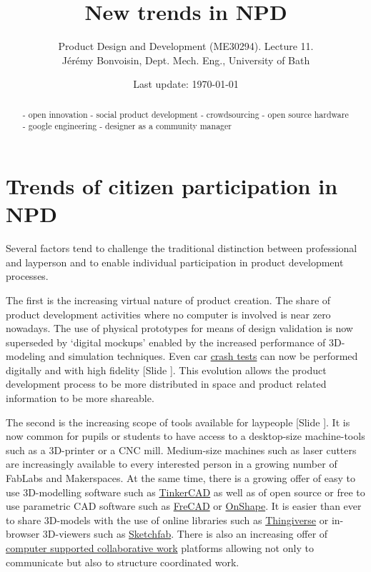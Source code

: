 \documentclass{article}
\newcounter{slide}
\begin{document}
\title{New trends in NPD}

\author{Product Design and Development (ME30294). Lecture 11. \\ Jérémy Bonvoisin, Dept. Mech. Eng., University of Bath}
\date{Last update: \today}

\maketitle

\begin{abstract}
- open innovation
- social product development
- crowdsourcing
- open source hardware
- google engineering
- designer as a community manager
\end{abstract}

\tableofcontents

\section{Trends of citizen participation in NPD}
\label{sec:context}
Several factors tend to challenge the traditional distinction between professional and layperson and to enable individual participation in product development processes. 

The first is the increasing virtual nature of product creation. The share of product development activities where no computer is involved is near zero nowadays. The use of physical prototypes for means of design validation is now superseded by `digital mockups' enabled by the increased performance of 3D-modeling and simulation techniques. Even car \href{https://www.youtube.com/watch?v=Cy_QFqnc88Q&feature=youtu.be}{crash tests} can now be performed digitally and with high fidelity {\color{blue}[Slide ]}. This evolution allows the product development process to be more distributed in space and product related information to be more shareable. 

The second is the increasing scope of tools available for laypeople {\color{blue}[Slide ]}. It is now common for pupils or students to have access to a desktop-size machine-tools such as a 3D-printer or a CNC mill. Medium-size machines such as laser cutters are increasingly available to every interested person in a growing number of FabLabs and Makerspaces. At the same time, there is a growing offer of easy to use 3D-modelling software such as \href{https://www.tinkercad.com/}{TinkerCAD} as well as of open source or free to use parametric CAD software such as \href{https://www.freecadweb.org/}{FreCAD} or \href{https://www.onshape.com/}{OnShape}. It is easier than ever to share 3D-models with the use of online libraries such as \href{https://www.thingiverse.com/}{Thingiverse} or in-browser 3D-viewers such as \href{https://sketchfab.com/}{Sketchfab}. There is also an increasing offer of \href{https://en.wikipedia.org/wiki/Computer-supported_cooperative_work}{computer supported collaborative work} platforms allowing not only to communicate but also to structure coordinated work. 
\end{document}
